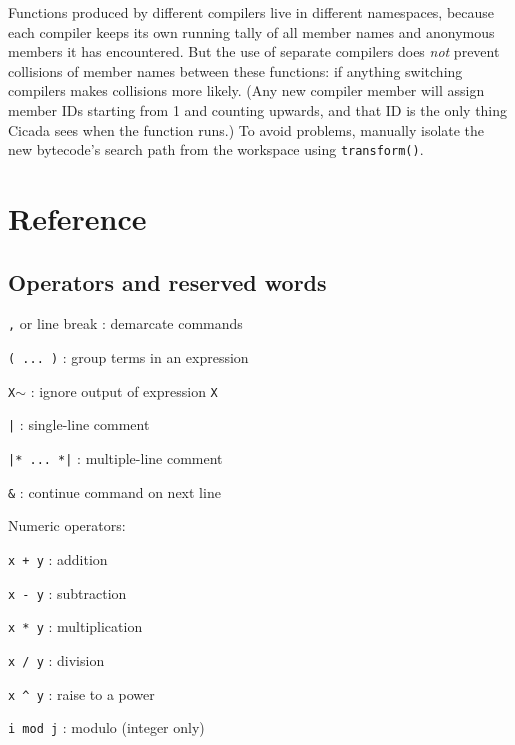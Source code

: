 \documentclass{article}
\begin{document}
Functions produced by different compilers live in different namespaces, because each compiler keeps its own running tally of all member names and anonymous members it has encountered.  But the use of separate compilers does \emph{not} prevent collisions of member names between these functions:  if anything switching compilers makes collisions more likely.  (Any new compiler member will assign member IDs starting from 1 and counting upwards, and that ID is the only thing Cicada sees when the function runs.)  To avoid problems, manually isolate the new bytecode's search path from the workspace using \verb#transform()#.


\newpage



\section{Reference}




\subsection{Operators and reserved words}   

\small

\noindent
\begin{description}
\item{\verb#,# or line break} :  demarcate commands
\item{\verb#( ... )#} :  group terms in an expression
\item{\verb#X#$\sim$} :  ignore output of expression \verb#X#
\item{\verb#|#} :  single-line comment
\item{\verb#|* ... *|#} :  multiple-line comment
\item{\verb#&#} :  continue command on next line\\
\end{description}

\noindent
Numeric operators:
\begin{description}
\item{\verb#x + y#} :  addition
\item{\verb#x - y#} :  subtraction
\item{\verb#x * y#} :  multiplication
\item{\verb#x / y#} :  division
\item{\verb#x ^ y#} :  raise to a power
\item{\verb#i mod j#} :  modulo (integer only)\\
\end{description}
\end{document}
